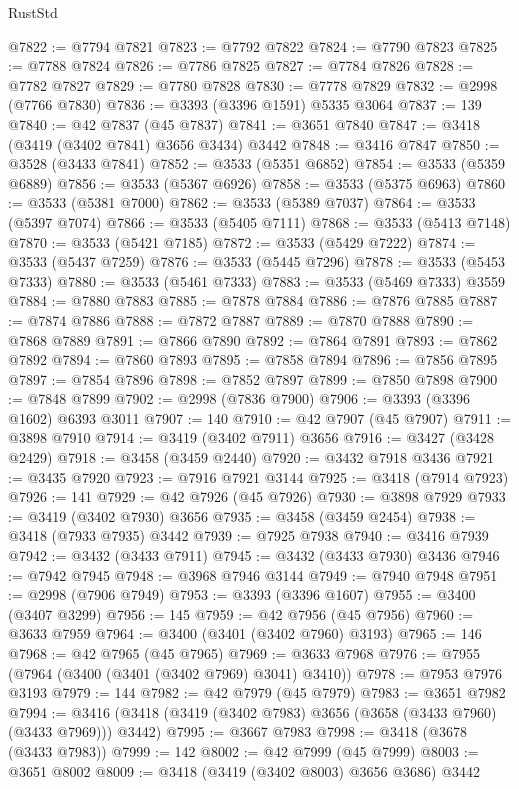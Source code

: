 \begin{lexlean}{RustStd}
\begin{coremodule}
@7822 := @7794 @7821
@7823 := @7792 @7822
@7824 := @7790 @7823
@7825 := @7788 @7824
@7826 := @7786 @7825
@7827 := @7784 @7826
@7828 := @7782 @7827
@7829 := @7780 @7828
@7830 := @7778 @7829
@7832 := @2998 (@7766 @7830)
@7836 := @3393 (@3396 @1591) @5335 @3064
@7837 := 139
@7840 := @42 @7837 (@45 @7837)
@7841 := @3651 @7840
@7847 := @3418 (@3419 (@3402 @7841) @3656 @3434) @3442
@7848 := @3416 @7847
@7850 := @3528 (@3433 @7841)
@7852 := @3533 (@5351 @6852)
@7854 := @3533 (@5359 @6889)
@7856 := @3533 (@5367 @6926)
@7858 := @3533 (@5375 @6963)
@7860 := @3533 (@5381 @7000)
@7862 := @3533 (@5389 @7037)
@7864 := @3533 (@5397 @7074)
@7866 := @3533 (@5405 @7111)
@7868 := @3533 (@5413 @7148)
@7870 := @3533 (@5421 @7185)
@7872 := @3533 (@5429 @7222)
@7874 := @3533 (@5437 @7259)
@7876 := @3533 (@5445 @7296)
@7878 := @3533 (@5453 @7333)
@7880 := @3533 (@5461 @7333)
@7883 := @3533 (@5469 @7333) @3559
@7884 := @7880 @7883
@7885 := @7878 @7884
@7886 := @7876 @7885
@7887 := @7874 @7886
@7888 := @7872 @7887
@7889 := @7870 @7888
@7890 := @7868 @7889
@7891 := @7866 @7890
@7892 := @7864 @7891
@7893 := @7862 @7892
@7894 := @7860 @7893
@7895 := @7858 @7894
@7896 := @7856 @7895
@7897 := @7854 @7896
@7898 := @7852 @7897
@7899 := @7850 @7898
@7900 := @7848 @7899
@7902 := @2998 (@7836 @7900)
@7906 := @3393 (@3396 @1602) @6393 @3011
@7907 := 140
@7910 := @42 @7907 (@45 @7907)
@7911 := @3898 @7910
@7914 := @3419 (@3402 @7911) @3656
@7916 := @3427 (@3428 @2429)
@7918 := @3458 (@3459 @2440)
@7920 := @3432 @7918 @3436
@7921 := @3435 @7920
@7923 := @7916 @7921 @3144
@7925 := @3418 (@7914 @7923)
@7926 := 141
@7929 := @42 @7926 (@45 @7926)
@7930 := @3898 @7929
@7933 := @3419 (@3402 @7930) @3656
@7935 := @3458 (@3459 @2454)
@7938 := @3418 (@7933 @7935) @3442
@7939 := @7925 @7938
@7940 := @3416 @7939
@7942 := @3432 (@3433 @7911)
@7945 := @3432 (@3433 @7930) @3436
@7946 := @7942 @7945
@7948 := @3968 @7946 @3144
@7949 := @7940 @7948
@7951 := @2998 (@7906 @7949)
@7953 := @3393 (@3396 @1607)
@7955 := @3400 (@3407 @3299)
@7956 := 145
@7959 := @42 @7956 (@45 @7956)
@7960 := @3633 @7959
@7964 := @3400 (@3401 (@3402 @7960) @3193)
@7965 := 146
@7968 := @42 @7965 (@45 @7965)
@7969 := @3633 @7968
@7976 := @7955 (@7964 (@3400 (@3401 (@3402 @7969) @3041) @3410))
@7978 := @7953 @7976 @3193
@7979 := 144
@7982 := @42 @7979 (@45 @7979)
@7983 := @3651 @7982
@7994 := @3416 (@3418 (@3419 (@3402 @7983) @3656 (@3658 (@3433 @7960) (@3433 @7969))) @3442)
@7995 := @3667 @7983
@7998 := @3418 (@3678 (@3433 @7983))
@7999 := 142
@8002 := @42 @7999 (@45 @7999)
@8003 := @3651 @8002
@8009 := @3418 (@3419 (@3402 @8003) @3656 @3686) @3442

\end{coremodule}
\end{lexlean}
